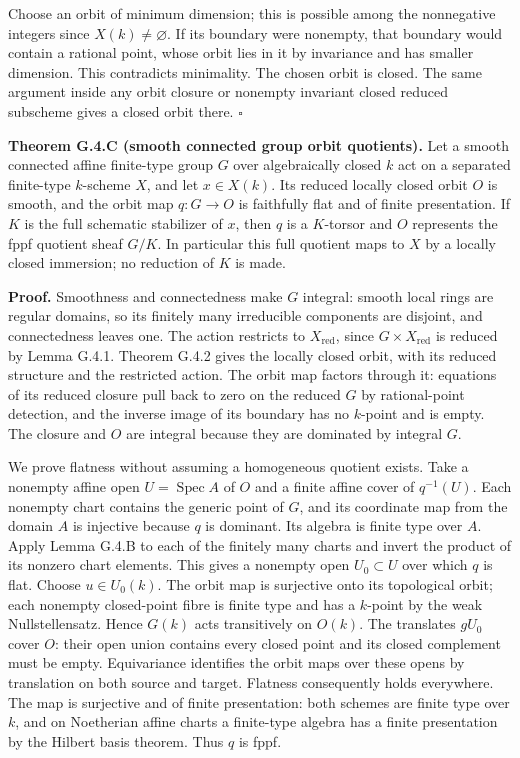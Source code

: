 \documentclass[11pt,a4paper,openany]{report}
\newcounter{none}
\begin{document}
Choose an orbit of minimum dimension; this is possible among the nonnegative integers since \(X(k)\ne\varnothing\). If its boundary were nonempty, that boundary would contain a rational point, whose orbit lies in it by invariance and has smaller dimension. This contradicts minimality. The chosen orbit is closed. The same argument inside any orbit closure or nonempty invariant closed reduced subscheme gives a closed orbit there. \(\square\)

\textbf{Theorem G.4.C (smooth connected group orbit quotients).} Let a smooth connected affine finite-type group \(G\) over algebraically closed \(k\) act on a separated finite-type \(k\)-scheme \(X\), and let \(x\in X(k)\). Its reduced locally closed orbit \(O\) is smooth, and the orbit map \(q:G\to O\) is faithfully flat and of finite presentation. If \(K\) is the full schematic stabilizer of \(x\), then \(q\) is a \(K\)-torsor and \(O\) represents the fppf quotient sheaf \(G/K\). In particular this full quotient maps to \(X\) by a locally closed immersion; no reduction of \(K\) is made.

\textbf{Proof.} Smoothness and connectedness make \(G\) integral: smooth local rings are regular domains, so its finitely many irreducible components are disjoint, and connectedness leaves one. The action restricts to \(X_{\mathrm{red}}\), since \(G\times X_{\mathrm{red}}\) is reduced by Lemma G.4.1. Theorem G.4.2 gives the locally closed orbit, with its reduced structure and the restricted action. The orbit map factors through it: equations of its reduced closure pull back to zero on the reduced \(G\) by rational-point detection, and the inverse image of its boundary has no \(k\)-point and is empty. The closure and \(O\) are integral because they are dominated by integral \(G\).

We prove flatness without assuming a homogeneous quotient exists. Take a nonempty affine open \(U=\operatorname{Spec}A\) of \(O\) and a finite affine cover of \(q^{-1}(U)\). Each nonempty chart contains the generic point of \(G\), and its coordinate map from the domain \(A\) is injective because \(q\) is dominant. Its algebra is finite type over \(A\). Apply Lemma G.4.B to each of the finitely many charts and invert the product of its nonzero chart elements. This gives a nonempty open \(U_0\subset U\) over which \(q\) is flat. Choose \(u\in U_0(k)\). The orbit map is surjective onto its topological orbit; each nonempty closed-point fibre is finite type and has a \(k\)-point by the weak Nullstellensatz. Hence \(G(k)\) acts transitively on \(O(k)\). The translates \(gU_0\) cover \(O\): their open union contains every closed point and its closed complement must be empty. Equivariance identifies the orbit maps over these opens by translation on both source and target. Flatness consequently holds everywhere. The map is surjective and of finite presentation: both schemes are finite type over \(k\), and on Noetherian affine charts a finite-type algebra has a finite presentation by the Hilbert basis theorem. Thus \(q\) is fppf.
\end{document}
